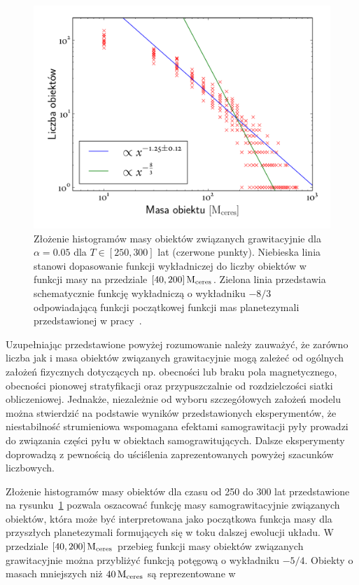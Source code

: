 \begin{figure}[ht]
   \centering
   \includegraphics[width=0.7\linewidth]{figures/mass_func}
   \caption{Złożenie histogramów masy obiektów związanych grawitacyjnie dla
   $\alpha = 0.05$ dla $T \in [250, 300]$ lat (czerwone punkty). Niebieska linia
stanowi dopasowanie funkcji wykładniczej do liczby obiektów w funkcji masy na
przedziale $[40,200]\hbox{$\mathrm{\thinspace M_{\textrm{ceres}}}$}$. Zielona linia przedstawia schematycznie funkcję
wykładniczą o wykładniku $-8/3$ odpowiadającą funkcji początkowej funkcji mas
planetezymali przedstawionej w pracy~\cite{MFFK98}.}
   \label{fig:massfun}
\end{figure}
\par Uzupełniając przedstawione powyżej rozumowanie należy zauważyć, że zarówno liczba
jak i masa obiektów związanych grawitacyjnie mogą zależeć od ogólnych założeń
fizycznych dotyczących np. obecności lub braku pola magnetycznego, obecności
pionowej stratyfikacji oraz przypuszczalnie od rozdzielczości siatki
obliczeniowej. Jednakże, niezależnie od wyboru szczegółowych założeń
modelu można stwierdzić na podstawie wyników przedstawionych eksperymentów, że
niestabilność strumieniowa wspomagana efektami samograwitacji pyły prowadzi do
związania części pyłu w obiektach samograwitujących. Dalsze eksperymenty
doprowadzą z pewnością do uściślenia zaprezentowanych powyżej szacunków
liczbowych.
%
\par Złożenie histogramów masy obiektów dla czasu od 250 do 300 lat
przedstawione na rysunku~\ref{fig:massfun} pozwala oszacować funkcję masy
samograwitacyjnie związanych obiektów, która może być interpretowana jako
początkowa funkcja masy dla przyszłych planetezymali formujących się w toku
dalszej ewolucji układu. W przedziale $[40, 200]\hbox{$\mathrm{\thinspace M_{\textrm{ceres}}}$}$ przebieg funkcji masy
obiektów związanych grawitacyjnie można przybliżyć funkcją potęgową o wykładniku
$-5/4$. Obiekty o masach mniejszych niż $40\hbox{$\mathrm{\thinspace M_{\textrm{ceres}}}$}$ są reprezentowane w
